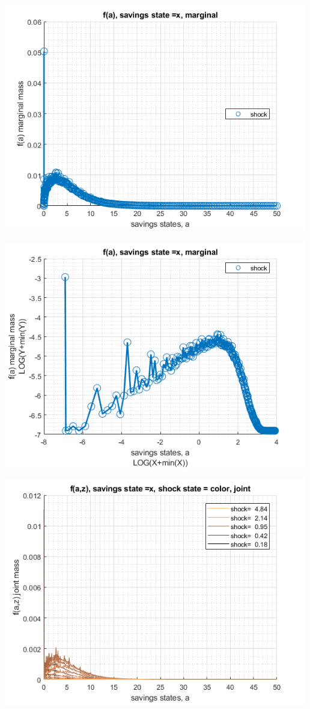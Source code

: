 \documentclass[
]{book}
\begin{document}
\includegraphics[width=5.20833in,height=\textheight]{img/fx_ds_az_loop_images/figure_7.png}

\includegraphics[width=5.20833in,height=\textheight]{img/fx_ds_az_loop_images/figure_8.png}

\includegraphics[width=5.20833in,height=\textheight]{img/fx_ds_az_loop_images/figure_9.png}
\end{document}
